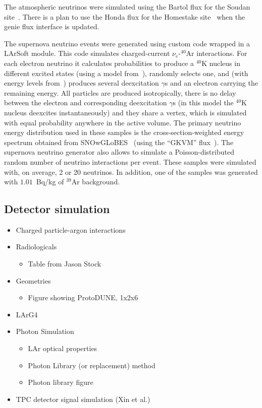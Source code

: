 The atmospheric neutrinos were simulated using the Bartol flux for the Soudan site~\cite{ref:bartol}. There is a plan to use the Honda flux for the Homestake site~\cite{ref:honda} when the {\sc genie} flux interface is updated. 

The supernova neutrino events were generated using custom code wrapped in a LArSoft module.
This code simulates charged-current $\nu_e$-$^{40}$Ar interactions.
For each electron neutrino it calculates probabilities to produce a $^{40}$K nucleus
in different excited states (using a model from~\cite{Bhattacharya:1998hc}),
randomly selects one, and (with energy levels from~\cite{Cameron:2004myb}) 
produces several deexcitation $\gamma$s and an electron carrying the remaining energy.
All particles are produced isotropically,
there is no delay between the electron and corresponding deexcitation $\gamma$s
(in this model the $^{40}$K nucleus deexcites instantaneously) and they share a vertex,
which is simulated with equal probability anywhere in the active volume.
The primary neutrino energy distribution used in these samples is the cross-section-weighted 
energy spectrum obtained from SNOwGLoBES~\cite{snowglobes} (using the ``GKVM'' flux~\cite{GKVM}).
The supernova neutrino generator also allows to simulate a Poisson-distributed random number 
of neutrino interactions per event. These samples were simulated with, on average, 2 or 20 neutrinos.
In addition, one of the samples was generated with $1.01$~Bq/kg of $^{39}$Ar background.

\subsection{Detector simulation}
\label{sec:tools-mc-detsim}

\begin{itemize}
\item Charged particle-argon interactions
\item Radiologicals
\begin{itemize} \item Table from Jason Stock \end{itemize}
\item Geometries
\begin{itemize} \item Figure showing ProtoDUNE, 1x2x6 \end{itemize}
\item LArG4
\item Photon Simulation
\begin{itemize}
\item LAr optical properties
\item Photon Library (or replacement) method
\item Photon library figure
\end{itemize}
\item TPC detector signal simulation (Xin et al.)
\end{itemize}

